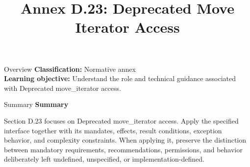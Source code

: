 \documentclass[10pt,letterpaper]{article}
\title{Annex D.23: Deprecated Move Iterator Access}
\author{}
\date{}
\begin{document}
\maketitle
\begin{CornellOverviewBox}{Overview}
\textbf{Classification:} Normative annex\\[2pt]
\textbf{Learning objective:} Understand the role and technical guidance associated with Deprecated move\_iterator access.
\end{CornellOverviewBox}\begin{CornellSummaryBox}{Summary}
{\sffamily\bfseries\color{Accent} Summary}\par\vspace{3pt}Section D.23 focuses on Deprecated move\_iterator access. Apply the specified interface together with its mandates, effects, result conditions, exception behavior, and complexity constraints. When applying it, preserve the distinction between mandatory requirements, recommendations, permissions, and behavior deliberately left undefined, unspecified, or implementation-defined.
\end{CornellSummaryBox}
\end{document}
